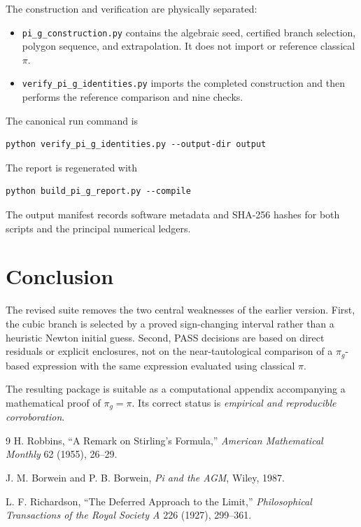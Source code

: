 \documentclass[11pt]{article}
\newcommand{\pig}{\pi_g}
\begin{document}
The construction and verification are physically separated:

\begin{itemize}[leftmargin=2em]
\item \texttt{pi\_g\_construction.py} contains the algebraic seed, certified branch selection, polygon sequence, and extrapolation.  It does not import or reference classical $\pi$.
\item \texttt{verify\_pi\_g\_identities.py} imports the completed construction and then performs the reference comparison and nine checks.
\end{itemize}

The canonical run command is
\begin{lstlisting}[style=outputstyle]
python verify_pi_g_identities.py --output-dir output
\end{lstlisting}

The report is regenerated with
\begin{lstlisting}[style=outputstyle]
python build_pi_g_report.py --compile
\end{lstlisting}

The output manifest records software metadata and SHA-256 hashes for both scripts and the principal numerical ledgers.

\section{Conclusion}

The revised suite removes the two central weaknesses of the earlier version.  First, the cubic branch is selected by a proved sign-changing interval rather than a heuristic Newton initial guess.  Second, PASS decisions are based on direct residuals or explicit enclosures, not on the near-tautological comparison of a $\pig$-based expression with the same expression evaluated using classical $\pi$.

The resulting package is suitable as a computational appendix accompanying a mathematical proof of $\pig=\pi$.  Its correct status is \emph{empirical and reproducible corroboration}.

\begin{thebibliography}{9}
H. Robbins,
``A Remark on Stirling's Formula,''
\emph{American Mathematical Monthly} 62 (1955), 26--29.

J. M. Borwein and P. B. Borwein,
\emph{Pi and the AGM},
Wiley, 1987.

L. F. Richardson,
``The Deferred Approach to the Limit,''
\emph{Philosophical Transactions of the Royal Society A} 226 (1927), 299--361.
\end{thebibliography}
\end{document}
